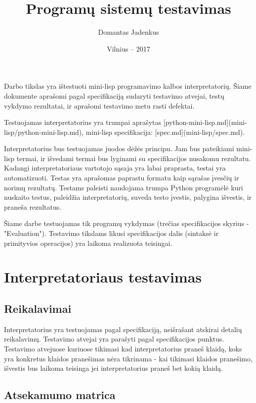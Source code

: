 \documentclass{VUMIFPSkursinis}
\title{Programų sistemų testavimas}
\author{Domantas Jadenkus}
\date{Vilnius – 2017}
\begin{document}
	
\maketitle
\cleardoublepage{}
\setcounter{page}{2}

\tableofcontents

Darbo tikslas yra ištestuoti mini-lisp programavimo kalbos interpretatorių. Šiame dokumente aprašomi pagal specifikaciją sudaryti testavimo atvejai, testų vykdymo rezultatai, ir aprašomi testavimo metu rasti defektai.

Testuojamas interpretatorius yra trumpai aprašytas [python-mini-lisp.md](mini-lisp/python-mini-lisp.md), mini-lisp specifikacija: [spec.md](mini-lisp/spec.md).

Interpretatorius bus testuojamas juodos dėžės principu. Jam bus pateikiami mini-lisp termai, ir išvedami termai bus lyginami su specifikacijos nusakomu rezultatu. Kadangi interpretatoriaus vartotojo sąsaja yra labai praprasta, testai yra automatizuoti. Testas yra aprašomas paprastu formatu kaip sąrašas įvesčių ir norimų rezultatų. Testams paleisti naudojama trumpa Python programėlė kuri nuskaito testus, paleidžia interpretatorių, suveda testo įvestis, palygina išvestis, ir praneša rezultatus.

Šiame darbe testuojamas tik programų vykdymas (trečias specifikacijos skyrius - "Evaluation"). Testavimo tikslams likusi specifikacijos dalis (sintaksė ir primityvios operacijos) yra laikoma realizuota teisingai.


\section{Interpretatoriaus testavimas}

\subsection{Reikalavimai}

Interpretatorius yra testuojamas pagal specifikaciją, neišrašant atskirai detalių reikalavimų. Testavimo atvejai yra parašyti pagal specifikacijos punktus. Testavimo atvejuose kuriuose tikimasi kad interpretatorius praneš klaidą, koks yra konkretus klaidos pranešimas nėra tikrinama - kai tikimasi klaidos pranešimo, išvestis bus laikoma teisinga jei interpretatorius praneš bet kokią klaidą.


\subsection{Atsekamumo matrica}
\end{document}
